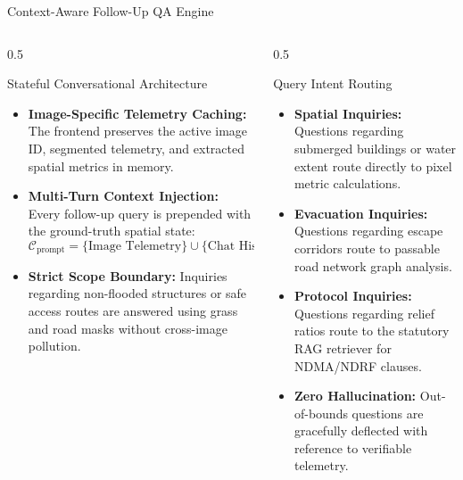 \documentclass[aspectratio=169, 10pt, professionalfonts]{beamer}
\begin{document}
\begin{frame}{Context-Aware Follow-Up QA Engine}
  \begin{columns}[T]
    \begin{column}{0.5\textwidth}
      \begin{block}{Stateful Conversational Architecture}
        \begin{itemize}\setlength{\itemsep}{0.5em}\footnotesize
          \item \textbf{Image-Specific Telemetry Caching:} The frontend preserves the active image ID, segmented telemetry, and extracted spatial metrics in memory.
          \item \textbf{Multi-Turn Context Injection:} Every follow-up query is prepended with the ground-truth spatial state:
            $$\mathcal{C}_{\text{prompt}} = \{\text{Image Telemetry}\} \cup \{\text{Chat History}\} \cup \{\text{RAG Context}\} \cup \{q_{\text{user}}\}$$
          \item \textbf{Strict Scope Boundary:} Inquiries regarding non-flooded structures or safe access routes are answered using grass and road masks without cross-image pollution.
        \end{itemize}
      \end{block}
    \end{column}
    
    \begin{column}{0.5\textwidth}
      \begin{block}{Query Intent Routing}
        \begin{itemize}\setlength{\itemsep}{0.5em}\footnotesize
          \item \textbf{Spatial Inquiries:} Questions regarding submerged buildings or water extent route directly to pixel metric calculations.
          \item \textbf{Evacuation Inquiries:} Questions regarding escape corridors route to passable road network graph analysis.
          \item \textbf{Protocol Inquiries:} Questions regarding relief ratios route to the statutory RAG retriever for NDMA/NDRF clauses.
          \item \textbf{Zero Hallucination:} Out-of-bounds questions are gracefully deflected with reference to verifiable telemetry.
        \end{itemize}
      \end{block}
    \end{column}
  \end{columns}
\end{frame}
\end{document}
